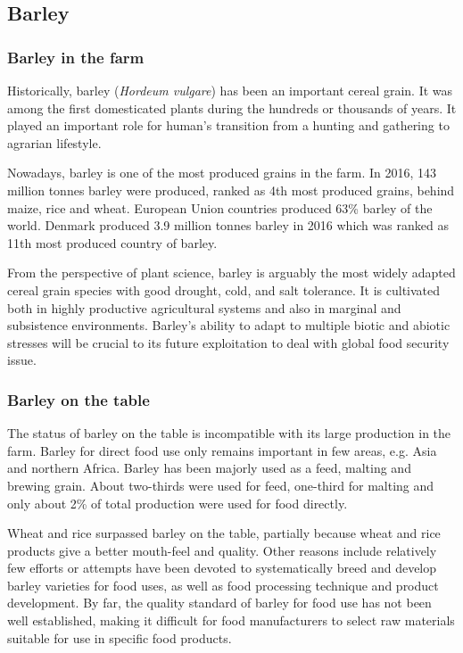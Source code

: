 \subsection{Barley}
\subsubsection{Barley in the farm}
Historically, barley (\textit{Hordeum vulgare}) has been an important cereal grain. It was among the first domesticated plants during the hundreds or thousands of years. It played an important role for human's transition from a hunting and gathering to agrarian lifestyle\cite{Baik2008,barleybook}. 

Nowadays, barley is one of the most produced grains in the farm. In 2016, 143 million tonnes barley were produced, ranked as 4th most produced grains, behind maize, rice and wheat. European Union countries produced 63\% barley of the world. Denmark produced 3.9 million tonnes barley in 2016 which was ranked as 11th most produced country of barley\cite{FAO2016}.

From the perspective of plant science, barley is arguably the most widely adapted cereal grain species with good drought, cold, and salt tolerance\cite{Ullrich2010}.
It is cultivated both in highly productive agricultural systems and also in marginal and subsistence environments\cite{barleyfeedtheworld}.
Barley's ability to adapt to multiple biotic and abiotic stresses\cite{barleyfeedtheworld} will be crucial to its future exploitation to deal with global food security issue.

\subsubsection{Barley on the table}
The status of barley on the table is incompatible with its large production 
in the farm. Barley for direct food use only remains important in few areas, e.g. Asia and northern Africa. Barley has been majorly used as a feed, malting and brewing grain\cite{barleyfeedtheworld,Baik2008}. About two-thirds were used for feed, one-third for malting and only about 2\% of total production were used for food directly\cite{Baik2008}.

Wheat and rice surpassed barley on the table, partially because wheat and rice products give a better mouth-feel and quality\cite{Baik2008}. Other reasons include relatively few efforts or attempts have been devoted to systematically breed and develop barley varieties for food uses, as well as food processing technique and product development\cite{Baik2008}. By far, the quality standard of barley for food use has not been well established, making it difficult for food manufacturers to select raw materials suitable for use in specific food products\cite{Baik2008}.

